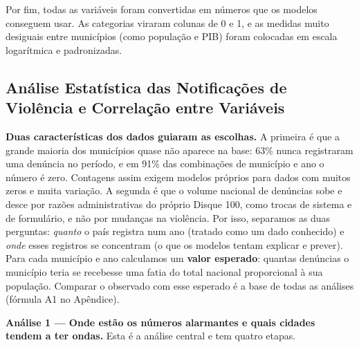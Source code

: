 \documentclass[12pt]{article}
\begin{document}
Por fim, todas as variáveis foram convertidas em números que os modelos conseguem usar. As categorias viraram colunas de 0 e 1, e as medidas muito desiguais entre municípios (como população e PIB) foram colocadas em escala logarítmica e padronizadas.

\subsection{Análise Estatística das Notificações de Violência e Correlação entre Variáveis}

\textbf{Duas características dos dados guiaram as escolhas.} A primeira é que a grande maioria dos municípios quase não aparece na base: 63\% nunca registraram uma denúncia no período, e em 91\% das combinações de município e ano o número é zero. Contagens assim exigem modelos próprios para dados com muitos zeros e muita variação. A segunda é que o volume nacional de denúncias sobe e desce por razões administrativas do próprio Disque 100, como trocas de sistema e de formulário, e não por mudanças na violência. Por isso, separamos as duas perguntas: \textit{quanto} o país registra num ano (tratado como um dado conhecido) e \textit{onde} esses registros se concentram (o que os modelos tentam explicar e prever). Para cada município e ano calculamos um \textbf{valor esperado}: quantas denúncias o município teria se recebesse uma fatia do total nacional proporcional à sua população. Comparar o observado com esse esperado é a base de todas as análises (fórmula A1 no Apêndice).

\textbf{Análise 1 --- Onde estão os números alarmantes e quais cidades tendem a ter ondas.} Esta é a análise central e tem quatro etapas.
\end{document}
